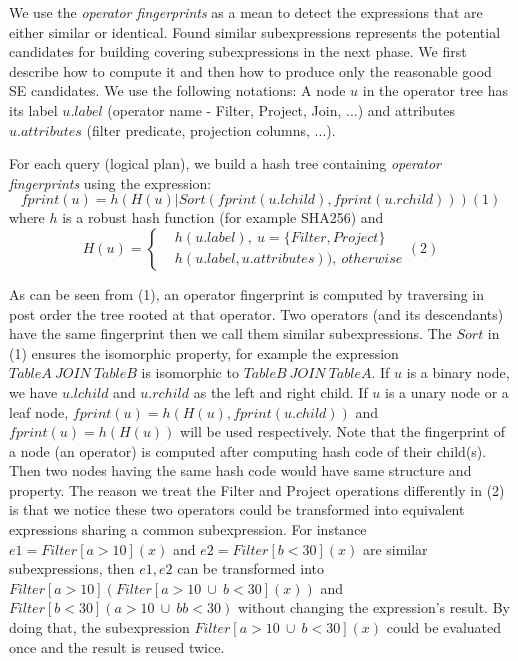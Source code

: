 We use the \emph{operator fingerprints} as a mean to detect the expressions that are either similar or identical. Found similar subexpressions represents the potential candidates for building covering subexpressions in the next phase. We first describe how to compute it and then how to produce only the reasonable good SE candidates. We use the following notations: A node $u$ in the operator tree has its label $u.label$ (operator name - Filter, Project, Join, ...) and attributes $u.attributes$ (filter predicate, projection columns, ...).


For each query (logical plan), we build a hash tree containing \emph{operator fingerprints} using the expression:
\[fprint(u)= h(H(u) | Sort(fprint(u.lchild), fprint(u.rchild))) (1)\]
where $h$ is a robust hash function (for example SHA256) and 
\[H(u)=
\begin{cases}
 & h(u.label),\ u= \{Filter, Project\}\\ 
 & h(u.label, u.attributes)),\ otherwise
\end{cases} (2)\]

As can be seen from (1), an operator fingerprint is computed by traversing in post order the tree rooted at that operator. Two operators (and its descendants) have the same fingerprint then we call them similar subexpressions. The $Sort$ in (1) ensures the isomorphic property, for example the expression $TableA\ JOIN\ TableB$ is isomorphic to $TableB\ JOIN\ TableA$. If $u$ is a binary node, we have $u.lchild$ and $u.rchild$ as the left and right child. If $u$ is a unary node or a leaf node, $fprint(u)= h(H(u), fprint(u.child))$ and $fprint(u)= h(H(u))$ will be used respectively. Note that the fingerprint of a node (an operator) is computed after computing hash code of their child(s). Then two nodes having the same hash code would have same structure and property. The reason we treat the Filter and Project operations differently in (2) is that we notice these two operators could be transformed into equivalent expressions sharing a common subexpression. For instance $e1 = Filter[a>10](x)$ and $e2 = Filter[b<30](x)$ are similar subexpressions, then $e1, e2$ can be transformed into $Filter[a>10](Filter[a>10\ \cup \ b < 30](x))$ and $Filter[b<30](a>10\ \cup \ b b < 30)$ without changing the expression's result. By doing that, the subexpression $Filter[a>10\ \cup \ b < 30](x)$ could be evaluated once and the result is reused twice.

